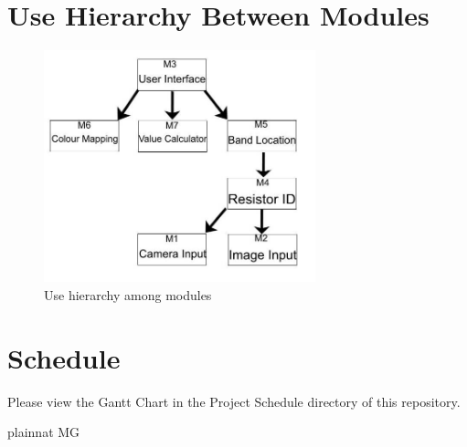 \documentclass[12pt, titlepage]{article}
\begin{document}
\section{Use Hierarchy Between Modules} \label{SecUse}

\begin{figure}[H]
\centering
\includegraphics[width=0.7\textwidth]{useshierarchy}
\caption{Use hierarchy among modules}
\label{FigUH}
\end{figure}

\section{Schedule}
Please view the Gantt Chart in the Project Schedule directory of this repository.


 {plainnat}
 {MG}
\end{document}
